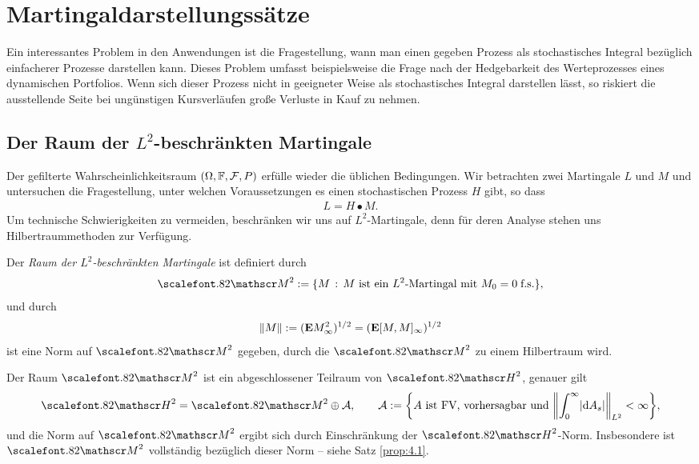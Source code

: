 \chapter{Martingaldarstellungssätze}

Ein interessantes Problem in den Anwendungen ist die Fragestellung, wann man
einen gegeben Prozess als stochastisches Integral bezüglich einfacherer
Prozesse darstellen kann. Dieses Problem umfasst beispielsweise die
Frage nach der Hedgebarkeit des Werteprozesses eines dynamischen Portfolios.
Wenn sich dieser Prozess nicht in geeigneter Weise als stochastisches Integral
darstellen lässt, so riskiert die ausstellende Seite bei ungünstigen
Kursverläufen große Verluste in Kauf zu nehmen.

\section{Der Raum der $L^2$-beschränkten Martingale}

Der gefilterte Wahrscheinlichkeitsraum $(\Omega, \mathbb{F}, \mathcal{F},P)$ erfülle wieder
die üblichen Bedingungen. Wir betrachten zwei Martingale $L$ und $M$ und
untersuchen die Fragestellung, unter welchen Voraussetzungen es einen
stochastischen Prozess $H$ gibt, so dass 
\begin{align*}
L = H\bullet M.
\end{align*}
Um technische Schwierigkeiten zu vermeiden, beschränken wir uns auf
$L^2$-Martingale, denn für deren Analyse stehen uns Hilbertraummethoden zur
Verfügung.

\begin{definition}
\label{defn:5.1}
Der \emph{Raum der $L^2$-beschränkten
Martingale} ist definiert durch
\begin{align*}
\MM^2 \defl \setdef{M}{M\text{ ist ein $L^2$-Martingal mit }M_0 = 0\;\fs},
\end{align*}
und durch
\begin{align*}
\lVert M\rVert := (\mathbf{E} M_\infty^2)^{1/2}= (\mathbf{E}[M,M]_\infty )^{1/2}
\end{align*}
ist eine Norm auf $\MM^2$ gegeben, durch die $\MM^2$ zu einem Hilbertraum
wird.\fish
\end{definition}

Der Raum $\MM^2$ ist ein abgeschlossener Teilraum von $\HH^2$, genauer gilt
\begin{align*}
\HH^2 = \MM^2 \oplus \AA,\qquad \AA\defl \setd*{A\text{ ist FV,
vorhersagbar und $\norm*{\int_0^\infty \abs{\dA_s}}_{L^2} < \infty$}},
\end{align*}
und die Norm auf $\MM^2$ ergibt sich durch Einschränkung der $\HH^2$-Norm.
Insbesondere ist $\MM^2$ vollständig bezüglich dieser Norm -- siehe Satz
\ref{prop:4.1}.

